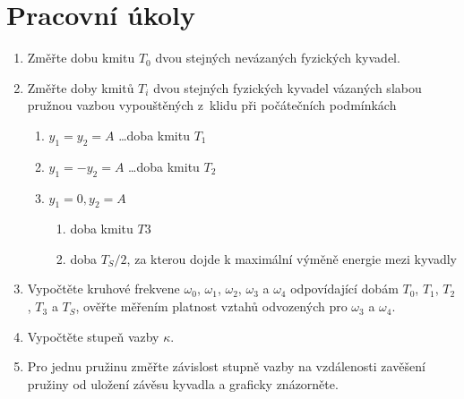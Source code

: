 \documentclass[a4paper]{article}
\author{Vladislav Wohlrath}
\begin{document}
\begin{titlepage}

\end{titlepage}

\section*{Pracovní úkoly}
\begin{enumerate}
\item Změřte dobu kmitu $T_0$ dvou stejných nevázaných fyzických kyvadel.
\item Změřte doby kmitů $T_i$ dvou stejných fyzických kyvadel vázaných slabou pružnou vazbou vypouštěných z~klidu při počátečních podmínkách
\begin{enumerate}
\item $y_1=y_2=A$ \ldots doba kmitu $T_1$
\item $y_1=-y_2=A$ \ldots doba kmitu $T_2$
\item $y_1=0, y_2=A$
	\begin{enumerate}
	\item doba kmitu $T3$
	\item doba $T_S/2$, za kterou dojde k maximální výměně energie mezi kyvadly
	\end{enumerate}
\end{enumerate}
\item Vypočtěte kruhové frekvene $\omega _0$, $\omega _1$, $\omega _2$, $\omega _3$ a $\omega _4$ odpovídající dobám $T_0$, $T_1$, $T_2$, $T_3$ a $T_S$, ověřte měřením platnost vztahů odvozených pro $\omega _3$ a $\omega _4$.
\item Vypočtěte stupeň vazby $\kappa$.
\item Pro jednu pružinu změřte závislost stupně vazby na vzdálenosti zavěšení pružiny od uložení závěsu kyvadla a graficky znázorněte.
\end{enumerate}












\printbibliography[title={Seznam použité literatury}]
\end{document}
